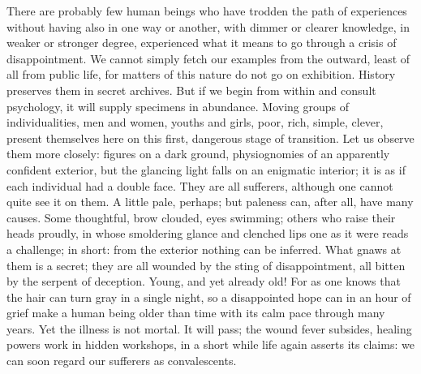\documentclass[12pt,a4paper,openany]{book}
\newcommand{\opage}[1]{\marginnote{\footnotesize\textit{[#1]}}}
\begin{document}
There are probably few human beings who have trodden
the path of experiences without having also in one way or another,
with dimmer or clearer knowledge, in weaker or
stronger degree, experienced what it means
to go through a crisis of disappointment. We cannot simply
fetch our examples from the outward, least of all
from public life, for matters of this nature do not go
on exhibition. History preserves them in secret
archives. But if we begin from within and consult
psychology, it will supply specimens in
abundance. Moving groups of individualities, men
and women, youths and girls, poor, rich, simple,
clever, present themselves here on this first, dangerous
stage of transition. Let us observe them more closely: figures
on a dark ground, physiognomies of an apparently
confident exterior, but the glancing light falls on an enigmatic
interior; it is as if each individual had a double
face. They are all sufferers, although one cannot quite
see it on them. A little pale, perhaps; but paleness
can, after all, have many causes. Some thoughtful,
brow clouded, eyes swimming; others who raise
their heads proudly, in whose smoldering glance and clenched
lips one as it were reads a challenge; in short: from the
exterior nothing can be inferred. What gnaws at them is a
secret; they are all wounded by the sting of disappointment,
all bitten by the serpent of deception. Young, and yet already
\setcounter{footnote}{0}%
\opage{26}old! For as one knows that the hair can turn gray in
a single night, so a disappointed hope can in an hour
of grief make a human being older than time with its calm
pace through many years. Yet the illness is not
mortal. It will pass; the wound fever subsides,
healing powers work in hidden workshops, in
a short while life again asserts its claims: we can
soon regard our sufferers as convalescents.
\end{document}
